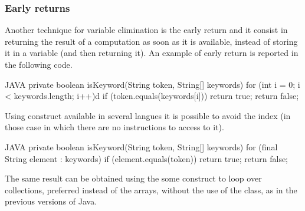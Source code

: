 \subsubsection{Early returns} 

Another technique for variable elimination is the early return and it consist in returning the result of a computation
as soon as it is available, instead of storing it in a variable (and then returning it).
An example of early return is reported in the following code.
\begin{code}{JAVA}
private boolean isKeyword(String token, String[] keywords) {
    for (int i = 0; i < keywords.length; i++)d
        if (token.equals(keywords[i])) 
            return true;
    return false;
}
\end{code}

Using  construct available in several langues it is possible to 
avoid the index (in those case in which there are no instructions to access to it).
\begin{code}{JAVA}
private boolean isKeyword(String token, String[] keywords) {
    for (final String element : keywords)
        if (element.equals(token))
            return true;
    return false;
}
\end{code}
The same result can be obtained using the some construct to loop over collections, 
preferred instead of the arrays, without the use of the  class, as 
in the previous versions of Java.



